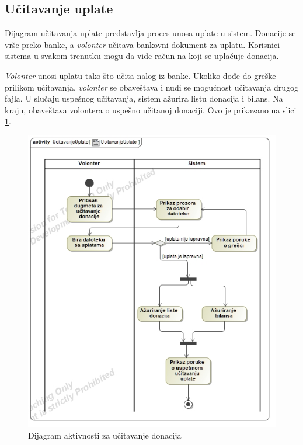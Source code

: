 \subsection{Učitavanje uplate}
\par Dijagram učitavanja uplate predstavlja proces unosa uplate u sistem. Donacije se vrše preko banke, a \textit{volonter} učitava bankovni dokument za uplatu.
Korisnici sistema u svakom trenutku mogu da vide račun na koji se uplaćuje donacija.
\par \textit{Volonter} unosi uplatu tako što učita nalog iz banke. Ukoliko dođe do greške prilikom učitavanja, \textit{volonter} se obaveštava i nudi se mogućnost
učitavanja drugog fajla. U slučaju uspešnog učitavanja, sistem ažurira listu donacija i bilans. Na kraju, obaveštava volontera o uspešno učitanoj donaciji.
Ovo je prikazano na slici \ref{fig:activity-load-donation}.
\begin{figure}[ht]
    \centering
    \includegraphics[width=\textwidth, height=\textwidth]{img/load_donation.jpg}
    \caption{Dijagram aktivnosti za učitavanje donacija}
    \label{fig:activity-load-donation}
\end{figure}